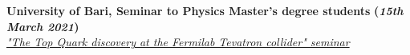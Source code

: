 \documentclass[11pt]{res}
\newcommand{\MarginText}[1]{\section{#1}\vspace{10pt}}
\begin{document}
\begin{resume}


\textbf{University of Bari, Seminar to Physics Master's degree students} \textbf{(\textit{15th March 2021})}\\ 
\href{https://recascloud.ba.infn.it/index.php/s/ItcCFRRq3gKGuXx}{\textit{"The Top Quark discovery at the Fermilab Tevatron collider" seminar}} %


											    















\end{resume}
\end{document}
